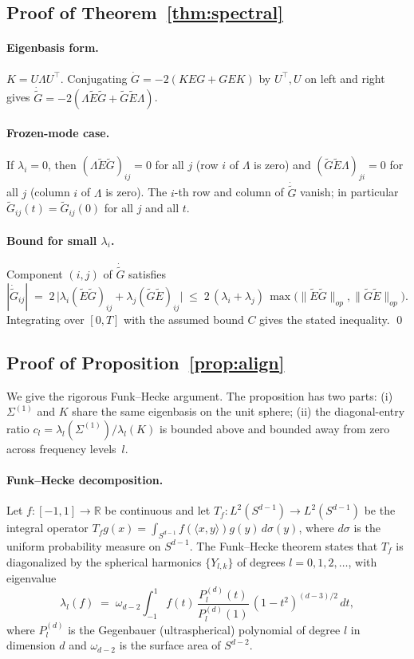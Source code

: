 \documentclass[11pt,letterpaper]{article}
\newcommand{\R}{\mathbb{R}}
\newcommand{\E}{E}
\newcommand{\Gtilde}{\widetilde{G}}
\newcommand{\Etilde}{\widetilde{\E}}
\begin{document}
\subsection{Proof of Theorem~\ref{thm:spectral}}

\paragraph{Eigenbasis form.}
$K = U\Lambda U^\top$. Conjugating
$\dot G = -2(K\E G + G\E K)$ by $U^\top, U$ on left and right gives
$\dot{\Gtilde} = -2(\Lambda\Etilde\Gtilde + \Gtilde\Etilde\Lambda)$.

\paragraph{Frozen-mode case.}
If $\lambda_i = 0$, then $(\Lambda \Etilde \Gtilde)_{ij} = 0$ for all $j$
(row $i$ of $\Lambda$ is zero) and $(\Gtilde\Etilde\Lambda)_{ji} = 0$ for
all $j$ (column $i$ of $\Lambda$ is zero). The $i$-th row and column of
$\dot{\Gtilde}$ vanish; in particular $\Gtilde_{ij}(t) = \Gtilde_{ij}(0)$
for all $j$ and all $t$.

\paragraph{Bound for small $\lambda_i$.}
Component $(i,j)$ of $\dot{\Gtilde}$ satisfies
\[
|\dot{\Gtilde}_{ij}|
\;=\; 2\,\bigl|\lambda_i (\Etilde\Gtilde)_{ij} + \lambda_j (\Gtilde\Etilde)_{ij}\bigr|
\;\leq\; 2\,(\lambda_i + \lambda_j)\,
\max\bigl(\|\Etilde\Gtilde\|_{op}, \|\Gtilde\Etilde\|_{op}\bigr).
\]
Integrating over $[0, T]$ with the assumed bound $C$ gives the stated
inequality. \qed

\subsection{Proof of Proposition~\ref{prop:align}}
\label{app:prop-align}

We give the rigorous Funk--Hecke argument. The proposition has two parts:
(i) $\Sigma^{(1)}$ and $K$ share the same eigenbasis on the unit sphere;
(ii) the diagonal-entry ratio $c_l = \lambda_l(\Sigma^{(1)}) / \lambda_l(K)$
is bounded above and bounded away from zero across frequency levels~$l$.

\paragraph{Funk--Hecke decomposition.}
Let $f \colon [-1, 1] \to \R$ be continuous and let
$T_f \colon L^2(S^{d-1}) \to L^2(S^{d-1})$ be the integral operator
$T_f g(x) = \int_{S^{d-1}} f(\langle x, y\rangle) g(y)\,d\sigma(y)$,
where $d\sigma$ is the uniform probability measure on $S^{d-1}$. The
Funk--Hecke theorem \citep[Theorem 2.22]{atkinson2012spherical} states that
$T_f$ is diagonalized by the spherical harmonics $\{Y_{l,k}\}$
of degrees $l = 0, 1, 2, \ldots$, with eigenvalue
\[
\lambda_l(f)
\;=\; \omega_{d-2} \int_{-1}^1 f(t)\,\frac{P_l^{(d)}(t)}{P_l^{(d)}(1)}\,
(1-t^2)^{(d-3)/2}\,dt,
\]
where $P_l^{(d)}$ is the Gegenbauer (ultraspherical) polynomial of degree
$l$ in dimension $d$ and $\omega_{d-2}$ is the surface area of $S^{d-2}$.
\end{document}
